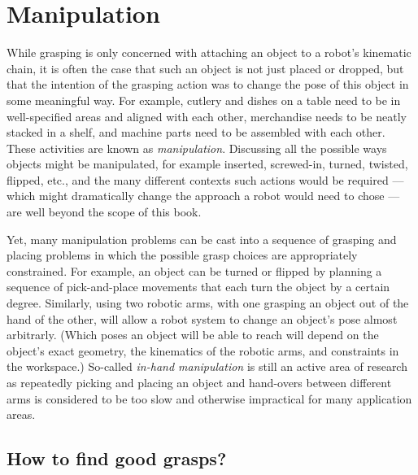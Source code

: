 \chapter{Manipulation}\label{chap:manipulation}
While grasping is only concerned with attaching an object to a robot's kinematic chain, it is often the case that such an object is not just placed or dropped, but that the intention of the grasping action was to change the pose of this object in some meaningful way. For example, cutlery and dishes on a table need to be in well-specified areas and aligned with each other, merchandise needs to be neatly stacked in a shelf, and machine parts need to be assembled with each other. These activities are known as \emph{manipulation}. Discussing all the possible ways objects might be manipulated, for example inserted, screwed-in, turned, twisted, flipped, etc., and the many different contexts such actions would be required --- which might dramatically change the approach a robot would need to chose --- are well beyond the scope of this book.

Yet, many manipulation problems can be cast into a sequence of grasping and placing problems in which the possible grasp choices are appropriately constrained. For example, an object can be turned or flipped by planning a sequence of pick-and-place movements that each turn the object by a certain degree. Similarly, using two robotic arms, with one grasping an object out of the hand of the other, will allow a robot system to change an object's pose almost arbitrarly. (Which poses an object will be able to reach will depend on the object's exact geometry, the kinematics of the robotic arms, and constraints in the workspace.) So-called \emph{in-hand manipulation} is still an active area of research as  repeatedly picking and placing an object and hand-overs between different arms is considered to be too slow and otherwise impractical for many application areas.  

\section{How to find good grasps?}

